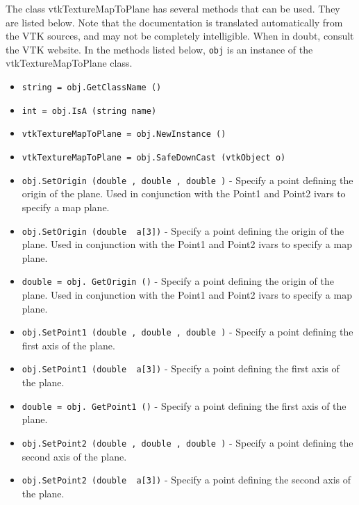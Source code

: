 The class vtkTextureMapToPlane has several methods that can be used.
  They are listed below.
Note that the documentation is translated automatically from the VTK sources,
and may not be completely intelligible.  When in doubt, consult the VTK website.
In the methods listed below, \verb|obj| is an instance of the vtkTextureMapToPlane class.
\begin{itemize}
\item  \verb|string = obj.GetClassName ()|

\item  \verb|int = obj.IsA (string name)|

\item  \verb|vtkTextureMapToPlane = obj.NewInstance ()|

\item  \verb|vtkTextureMapToPlane = obj.SafeDownCast (vtkObject o)|

\item  \verb|obj.SetOrigin (double , double , double )| -  Specify a point defining the origin of the plane. Used in conjunction with
 the Point1 and Point2 ivars to specify a map plane.

\item  \verb|obj.SetOrigin (double  a[3])| -  Specify a point defining the origin of the plane. Used in conjunction with
 the Point1 and Point2 ivars to specify a map plane.

\item  \verb|double = obj. GetOrigin ()| -  Specify a point defining the origin of the plane. Used in conjunction with
 the Point1 and Point2 ivars to specify a map plane.

\item  \verb|obj.SetPoint1 (double , double , double )| -  Specify a point defining the first axis of the plane.

\item  \verb|obj.SetPoint1 (double  a[3])| -  Specify a point defining the first axis of the plane.

\item  \verb|double = obj. GetPoint1 ()| -  Specify a point defining the first axis of the plane.

\item  \verb|obj.SetPoint2 (double , double , double )| -  Specify a point defining the second axis of the plane.

\item  \verb|obj.SetPoint2 (double  a[3])| -  Specify a point defining the second axis of the plane.


\end{itemize}

